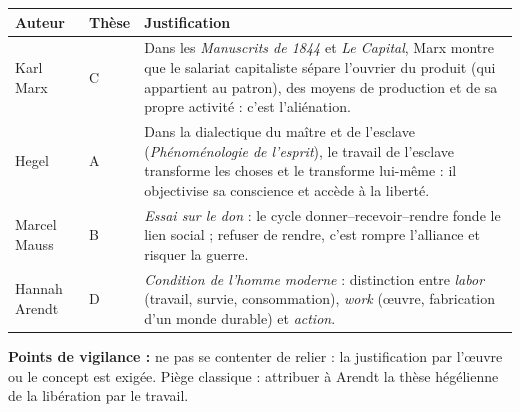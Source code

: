 \documentclass[11pt]{article}
\begin{document}
\begin{corrige}
\begin{center}
\begin{tabularx}{\linewidth}{|l|l|X|}\hline
\textbf{Auteur} & \textbf{Thèse} & \textbf{Justification} \\ \hline
Karl Marx & C & Dans les \emph{Manuscrits de 1844} et \emph{Le Capital}, Marx montre que le salariat capitaliste sépare l'ouvrier du produit (qui appartient au patron), des moyens de production et de sa propre activité : c'est l'aliénation. \\ \hline
Hegel & A & Dans la dialectique du maître et de l'esclave (\emph{Phénoménologie de l'esprit}), le travail de l'esclave transforme les choses et le transforme lui-même : il objectivise sa conscience et accède à la liberté. \\ \hline
Marcel Mauss & B & \emph{Essai sur le don} : le cycle donner--recevoir--rendre fonde le lien social ; refuser de rendre, c'est rompre l'alliance et risquer la guerre. \\ \hline
Hannah Arendt & D & \emph{Condition de l'homme moderne} : distinction entre \emph{labor} (travail, survie, consommation), \emph{work} (œuvre, fabrication d'un monde durable) et \emph{action}. \\ \hline
\end{tabularx}
\end{center}
\textbf{Points de vigilance :} ne pas se contenter de relier : la justification par l'œuvre ou le concept est exigée. Piège classique : attribuer à Arendt la thèse hégélienne de la libération par le travail.
\end{corrige}
\end{document}
